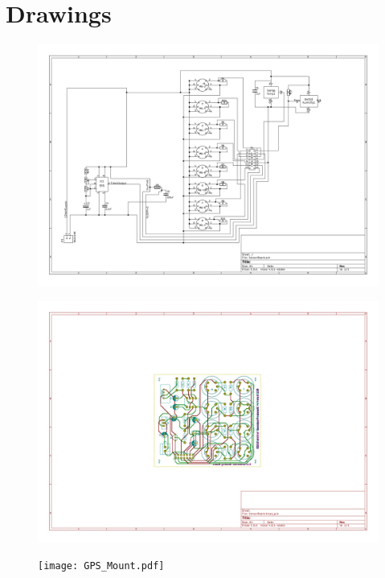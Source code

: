 \appendixpagenumbering
\chapter{Drawings} \label{App:Drawings}

\begin{figure}[H]
	\centerline{\includegraphics[angle=90,width=1.0\linewidth]{images/SensorSchematic.pdf}}
\end{figure}

\begin{figure}[H]
	\centerline{\includegraphics[angle=90,width=1.0\linewidth]{images/completeboard.pdf}}
\end{figure}

\begin{figure}[H]
	\centerline{\texttt{[image: GPS\_Mount.pdf]}}
\end{figure}

